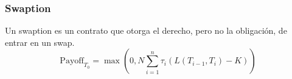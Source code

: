 
\begin{frame}
    \frametitle{Swaption}
    \begin{defin}[Swaption]
        Un swaption es un contrato que otorga el derecho, pero no la obligación, de entrar en un swap.
        \begin{equation*}
        \text{Payoff}_{T_0} = \max\left(0, N \sum_{i=1}^n \tau_i (L(T_{i-1}, T_i) - K)\right)
        \end{equation*}
    \end{defin}
\end{frame}

